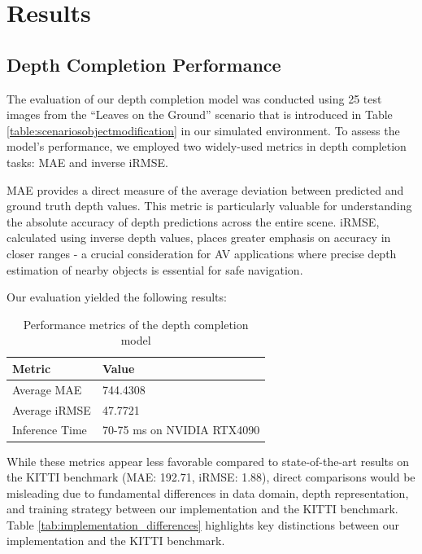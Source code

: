 
\chapter{Results}\label{chapter:results}
\section{Depth Completion Performance}

The evaluation of our depth completion model was conducted using 25 test images from the ``Leaves on the Ground'' scenario that is introduced in Table \ref{table:scenariosobjectmodification} in our simulated environment. To assess the model's performance, we employed two widely-used metrics in depth completion tasks: \ac{MAE} and inverse \ac{iRMSE}.

\ac{MAE} provides a direct measure of the average deviation between predicted and ground truth depth values. This metric is particularly valuable for understanding the absolute accuracy of depth predictions across the entire scene. \ac{iRMSE}, calculated using inverse depth values, places greater emphasis on accuracy in closer ranges - a crucial consideration for \ac{AV} applications where precise depth estimation of nearby objects is essential for safe navigation.

Our evaluation yielded the following results:
\begin{table}[h]
\centering
\begin{tabular}{ll}
\hline
\textbf{Metric} & \textbf{Value} \\
\hline
Average \ac{MAE} & 744.4308 \\
Average \ac{iRMSE} & 47.7721 \\
Inference Time & 70-75 ms on NVIDIA RTX4090 \\
\hline
\end{tabular}
\caption{Performance metrics of the depth completion model}
\label{tab:depth_metrics}
\end{table}

While these metrics appear less favorable compared to state-of-the-art results on the KITTI benchmark (\ac{MAE}: 192.71, \ac{iRMSE}: 1.88), direct comparisons would be misleading due to fundamental differences in data domain, depth representation, and training strategy between our implementation and the KITTI benchmark. Table \ref{tab:implementation_differences} highlights key distinctions between our implementation and the KITTI benchmark.

